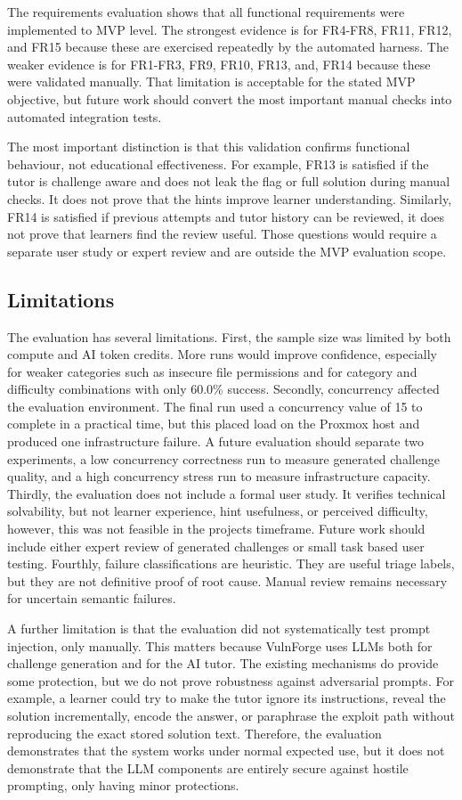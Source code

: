 The requirements evaluation shows that all functional requirements were implemented to MVP level. The strongest evidence is for FR4-FR8, FR11, FR12, and FR15 because these are exercised repeatedly by the automated harness. The weaker evidence is for FR1-FR3, FR9, FR10, FR13, and, FR14 because these were validated manually. That limitation is acceptable for the stated MVP objective, but future work should convert the most important manual checks into automated integration tests.

The most important distinction is that this validation confirms functional behaviour, not educational effectiveness. For example, FR13 is satisfied if the tutor is challenge aware and does not leak the flag or full solution during manual checks. It does not prove that the hints improve learner understanding. Similarly, FR14 is satisfied if previous attempts and tutor history can be reviewed, it does not prove that learners find the review useful. Those questions would require a separate user study or expert review and are outside the MVP evaluation scope.

\subsection{Limitations}\label{sec:eval-limitations}

The evaluation has several limitations. First, the sample size was limited by both compute and AI token credits. More runs would improve confidence, especially for weaker categories such as insecure file permissions and for category and difficulty combinations with only 60.0\% success. Secondly, concurrency affected the evaluation environment. The final run used a concurrency value of 15 to complete in a practical time, but this placed load on the Proxmox host and produced one infrastructure failure. A future evaluation should separate two experiments, a low concurrency correctness run to measure generated challenge quality, and a high concurrency stress run to measure infrastructure capacity. Thirdly, the evaluation does not include a formal user study. It verifies technical solvability, but not learner experience, hint usefulness, or perceived difficulty, however, this was not feasible in the projects timeframe. Future work should include either expert review of generated challenges or small task based user testing. Fourthly, failure classifications are heuristic. They are useful triage labels, but they are not definitive proof of root cause. Manual review remains necessary for uncertain semantic failures.

A further limitation is that the evaluation did not systematically test prompt injection, only manually. This matters because VulnForge uses LLMs both for challenge generation and for the AI tutor. The existing mechanisms do provide some protection, but we do not prove robustness against adversarial prompts. For example, a learner could try to make the tutor ignore its instructions, reveal the solution incrementally, encode the answer, or paraphrase the exploit path without reproducing the exact stored solution text. Therefore, the evaluation demonstrates that the system works under normal expected use, but it does not demonstrate that the LLM components are entirely secure against hostile prompting, only having minor protections.
